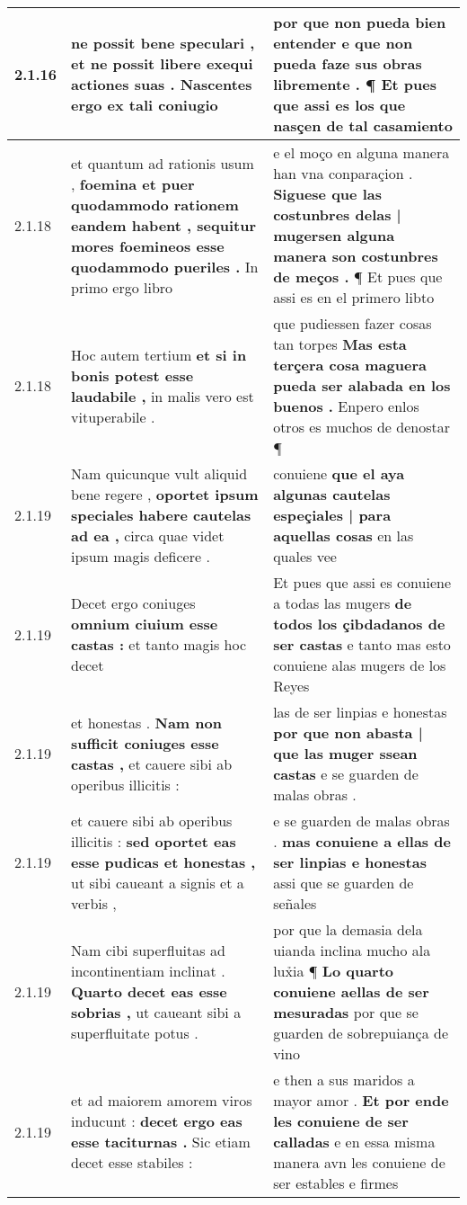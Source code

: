 \begin{tabular}{|p{1cm}|p{6.5cm}|p{6.5cm}|}
2.1.16 & ne possit bene speculari , \textbf{ et ne possit libere exequi actiones suas . } Nascentes ergo ex tali coniugio & por que non pueda bien entender \textbf{ e que non pueda faze sus obras libremente . } ¶ Et pues que assi es los que nasçen de tal casamiento \\\hline
2.1.18 & et quantum ad rationis usum , \textbf{ foemina et puer quodammodo rationem eandem habent , sequitur mores foemineos esse quodammodo pueriles . } In primo ergo libro & e el moço en alguna manera han vna conparaçion . \textbf{ Siguese que las costunbres delas | mugersen alguna manera son costunbres de meços . } ¶ Et pues que assi es en el primero libto \\\hline
2.1.18 & Hoc autem tertium \textbf{ et si in bonis potest esse laudabile , } in malis vero est vituperabile . & que pudiessen fazer cosas tan torpes \textbf{ Mas esta terçera cosa maguera pueda ser alabada en los buenos . } Enpero enlos otros es muchos de denostar ¶ \\\hline
2.1.19 & Nam quicunque vult aliquid bene regere , \textbf{ oportet ipsum speciales habere cautelas ad ea , } circa quae videt ipsum magis deficere . & conuiene \textbf{ que el aya algunas cautelas espeçiales | para aquellas cosas } en las quales vee \\\hline
2.1.19 & Decet ergo coniuges \textbf{ omnium ciuium esse castas : } et tanto magis hoc decet & Et pues que assi es conuiene a todas las mugers \textbf{ de todos los çibdadanos de ser castas } e tanto mas esto conuiene alas mugers de los Reyes \\\hline
2.1.19 & et honestas . \textbf{ Nam non sufficit coniuges esse castas , } et cauere sibi ab operibus illicitis : & las de ser linpias e honestas \textbf{ por que non abasta | que las muger ssean castas } e se guarden de malas obras . \\\hline
2.1.19 & et cauere sibi ab operibus illicitis : \textbf{ sed oportet eas esse pudicas et honestas , } ut sibi caueant a signis et a verbis , & e se guarden de malas obras . \textbf{ mas conuiene a ellas de ser linpias e honestas } assi que se guarden de señales \\\hline
2.1.19 & Nam cibi superfluitas ad incontinentiam inclinat . \textbf{ Quarto decet eas esse sobrias , } ut caueant sibi a superfluitate potus . & por que la demasia dela uianda inclina mucho ala lux̉ia ¶ \textbf{ Lo quarto conuiene aellas de ser mesuradas } por que se guarden de sobrepuiança de vino \\\hline
2.1.19 & et ad maiorem amorem viros inducunt : \textbf{ decet ergo eas esse taciturnas . } Sic etiam decet esse stabiles : & e then a sus maridos a mayor amor . \textbf{ Et por ende les conuiene de ser calladas } e en essa misma manera avn les conuiene de ser estables e firmes \\\hline

\end{tabular}
